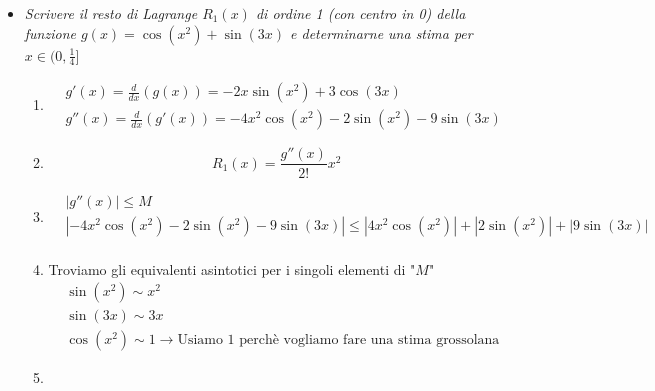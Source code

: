 \documentclass[10pt, a4paper]{article}
\begin{document}
\begin{itemize}
\begin{enumerate}
            \end{enumerate}
            \item \textit{Scrivere il resto di Lagrange $R_1(x)$ di ordine 1 (con centro in 0) della funzione $g(x)=\cos(x^2)+\sin(3x)$ e determinarne una stima per $x\in(0,\frac{1}{4}]$} \begin{enumerate}
                \item \begin{equation*}
                    \begin{split}
                        &g'(x)=\frac{d}{dx}(g(x))=-2x\sin(x^2)+3\cos(3x)\\
                        &g''(x)=\frac{d}{dx}(g'(x))=-4x^2\cos(x^2)-2\sin(x^2)-9\sin(3x)
                    \end{split}
                \end{equation*}
                \item \begin{equation*}
                    R_1(x)=\frac{g''(x)}{2!}x^2
                \end{equation*}
                \item \begin{equation*}
                    \begin{split}
                        &\left|g''(x)\right|\leq M\\
                        &\left|-4x^2\cos(x^2)-2\sin(x^2)-9\sin(3x)\right|\leq \left|4x^2\cos(x^2)\right|+\left|2\sin(x^2)\right|+\left|9\sin(3x)\right|\\
                    \end{split}
                \end{equation*}
                \item Troviamo gli equivalenti asintotici per i singoli elementi di "$M$" \begin{equation*}
                    \begin{split}
                        &\sin(x^2)\sim x^2\\
                        &\sin(3x) \sim 3x\\
                        &\cos(x^2) \sim 1 \rightarrow \text{Usiamo 1 perchè vogliamo fare una stima grossolana}
                    \end{split}
                \end{equation*}
                \item \begin{equation*}

\end{equation*}
\end{enumerate}
\end{itemize}
\end{document}
